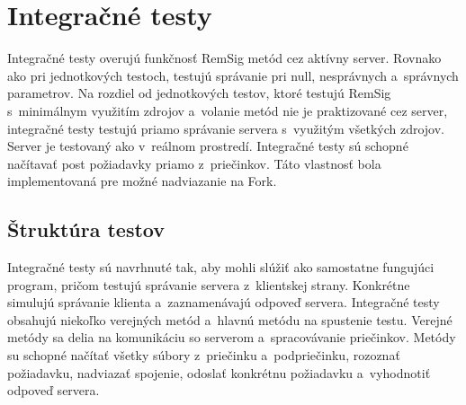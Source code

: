 \documentclass[
  digital, %
  table,   %
oneside,
  nolof,     %
  nolot,     %
]{fithesis3}
\begin{document}
\section{Integračné testy}
Integračné testy  overujú funkčnosť RemSig metód cez aktívny server. Rovnako ako pri jednotkových testoch, testujú správanie pri null, nesprávnych a~správnych parametrov. Na rozdiel od jednotkových testov, ktoré testujú RemSig s~minimálnym využitím zdrojov a~volanie metód nie je praktizované cez server, integračné testy testujú priamo správanie servera s~využitým všetkých zdrojov. Server je testovaný ako v~reálnom prostredí. Integračné testy sú schopné načítavať post požiadavky priamo z~priečinkov. Táto  vlastnosť bola implementovaná pre možné nadviazanie na  Fork.
\subsection{Štruktúra testov}  
 Integračné testy sú navrhnuté tak, aby mohli slúžiť ako samostatne fungujúci program, pričom testujú správanie servera z~klientskej strany. Konkrétne simulujú správanie klienta a~zaznamenávajú odpoveď servera. Integračné testy obsahujú niekoľko verejných metód a~hlavnú metódu na spustenie testu. Verejné metódy sa delia na komunikáciu so serverom a~spracovávanie priečinkov. Metódy su schopné načítať všetky súbory z~priečinku a~podpriečinku, rozoznať požiadavku, nadviazať spojenie, odoslať konkrétnu požiadavku a~vyhodnotiť odpoveď servera. 
\end{document}
